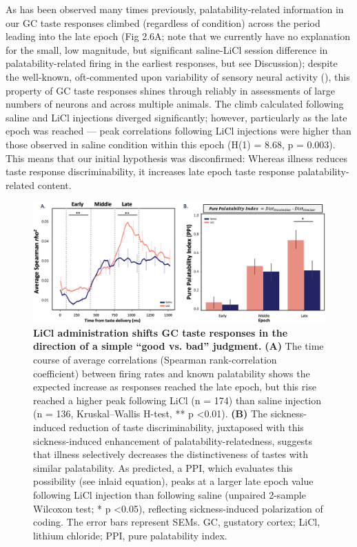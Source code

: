 \begin{refsection}
As has been observed many times previously, palatability-related information in our GC taste responses climbed (regardless of condition) across the period leading into the late epoch (Fig 2.6A; note that we currently have no explanation for the small, low magnitude, but significant saline-LiCl session difference in palatability-related firing in the earliest responses, but see Discussion); despite the well-known, oft-commented upon variability of sensory neural activity (\cite{shadlen1998a,shadlen1994a}), this property of GC taste responses shines through reliably in assessments of large numbers of neurons and across multiple animals. The climb calculated following saline and LiCl injections diverged significantly; however, particularly as the late epoch was reached --- peak correlations following LiCl injections were higher than those observed in saline condition within this epoch (H(1) = 8.68, p = 0.003). This means that our initial hypothesis was disconfirmed: Whereas illness reduces taste response discriminability, it increases late epoch taste response palatability-related content.

\begin{figure}
\includegraphics[width=\linewidth]{stone_2022_figs/journal.pbio.3001537.g006.png} 
\caption{\textbf{LiCl administration shifts GC taste responses in the direction of a simple “good vs. bad” judgment.}
\textbf{(A)} The time course of average correlations (Spearman rank-correlation coefficient) between firing rates and known palatability shows the expected increase as responses reached the late epoch, but this rise reached a higher peak following LiCl (n = 174) than saline injection (n = 136, Kruskal–Wallis H-test, ** p \textless 0.01). \textbf{(B)} The sickness-induced reduction of taste discriminability, juxtaposed with this sickness-induced enhancement of palatability-relatedness, suggests that illness selectively decreases the distinctiveness of tastes with similar palatability. As predicted, a PPI, which evaluates this possibility (see inlaid equation), peaks at a larger late epoch value following LiCl injection than following saline (unpaired 2-sample Wilcoxon test; * p \textless 0.05), reflecting sickness-induced polarization of coding. The error bars represent SEMs. GC, gustatory cortex; LiCl, lithium chloride; PPI, pure palatability index.
}
\label{fig:wrapfig}
\end{figure}



\end{refsection}
